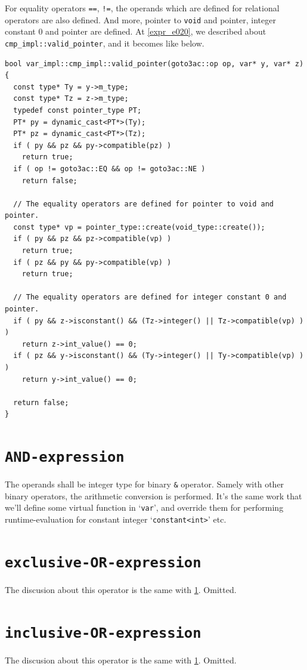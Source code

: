 For equality operators {\tt{==}}, {\tt{!=}}, 
the operands which are defined for relational operators
are also defined. And more,
pointer to {\tt{void}} and pointer,
integer constant 0 and pointer are defined.
At \ref{expr_e020}, we described
about {\tt{cmp\_impl::valid\_pointer}},
and it becomes like below.
\begin{verbatim}
bool var_impl::cmp_impl::valid_pointer(goto3ac::op op, var* y, var* z)
{
  const type* Ty = y->m_type;
  const type* Tz = z->m_type;
  typedef const pointer_type PT;
  PT* py = dynamic_cast<PT*>(Ty);
  PT* pz = dynamic_cast<PT*>(Tz);
  if ( py && pz && py->compatible(pz) )
    return true;
  if ( op != goto3ac::EQ && op != goto3ac::NE )
    return false;

  // The equality operators are defined for pointer to void and pointer.
  const type* vp = pointer_type::create(void_type::create());
  if ( py && pz && pz->compatible(vp) )
    return true;
  if ( pz && py && py->compatible(vp) )
    return true;

  // The equality operators are defined for integer constant 0 and pointer.
  if ( py && z->isconstant() && (Tz->integer() || Tz->compatible(vp) ) )
    return z->int_value() == 0;
  if ( pz && y->isconstant() && (Ty->integer() || Ty->compatible(vp) ) )
    return y->int_value() == 0;

  return false;
}
\end{verbatim}

\section{\tt{AND-expression}}
\label{expr_e021}
The operands shall be integer type for binary {\tt{\&}} operator.
Samely with other binary operators, the arithmetic conversion is
performed. It's the same work that we'll define some virtual function
in `{\tt{var}}', and override them for performing runtime-evaluation
for constant integer `{\tt{constant<int>}}' etc.

\section{\tt{exclusive-OR-expression}}
The discusion about this operator is the same with \ref{expr_e021}.
Omitted.

\section{\tt{inclusive-OR-expression}}
The discusion about this operator is the same with \ref{expr_e021}.
Omitted.

